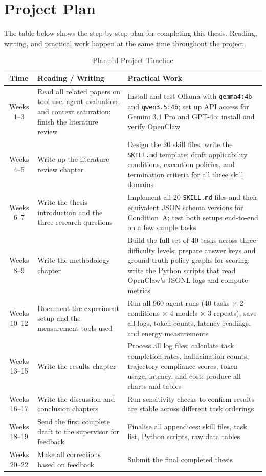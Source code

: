 \section{Project Plan}
\label{sec:plan}

The table below shows the step-by-step plan for completing this thesis. Reading, writing, and practical work happen at the same time throughout the project.

\begin{table}[h!]
    \centering
    \begin{tabularx}{\textwidth}{ | c | X | X | }
        \hline
        \textbf{Time} & \textbf{Reading / Writing} & \textbf{Practical Work} \\
        \hline
        Weeks 1--3   & Read all related papers on tool use, agent evaluation, and context saturation; finish the literature review & Install and test Ollama with \texttt{gemma4:4b} and \texttt{qwen3.5:4b}; set up API access for Gemini 3.1 Pro and GPT-4o; install and verify OpenClaw \\
        \hline
        Weeks 4--5   & Write up the literature review chapter & Design the 20 skill files; write the \texttt{SKILL.md} template; draft applicability conditions, execution policies, and termination criteria for all three skill domains \\
        \hline
        Weeks 6--7   & Write the thesis introduction and the three research questions & Implement all 20 \texttt{SKILL.md} files and their equivalent JSON schema versions for Condition~A; test both setups end-to-end on a few sample tasks \\
        \hline
        Weeks 8--9   & Write the methodology chapter & Build the full set of 40 tasks across three difficulty levels; prepare answer keys and ground-truth policy graphs for scoring; write the Python scripts that read OpenClaw's JSONL logs and compute metrics \\
        \hline
        Weeks 10--12 & Document the experiment setup and the measurement tools used & Run all 960 agent runs (40 tasks $\times$ 2 conditions $\times$ 4 models $\times$ 3 repeats); save all logs, token counts, latency readings, and energy measurements \\
        \hline
        Weeks 13--15 & Write the results chapter & Process all log files; calculate task completion rates, hallucination counts, trajectory compliance scores, token usage, latency, and cost; produce all charts and tables \\
        \hline
        Weeks 16--17 & Write the discussion and conclusion chapters & Run sensitivity checks to confirm results are stable across different task orderings \\
        \hline
        Weeks 18--19 & Send the first complete draft to the supervisor for feedback & Finalise all appendices: skill files, task list, Python scripts, raw data tables \\
        \hline
        Weeks 20--22 & Make all corrections based on feedback & Submit the final completed thesis \\
        \hline
    \end{tabularx}
    \caption{Planned Project Timeline}
    \label{tab:timeline}
\end{table}


